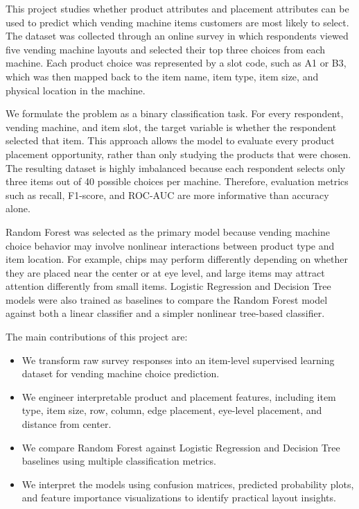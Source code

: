 \documentclass{article}
\begin{document}
This project studies whether product attributes and placement attributes can be used to predict which vending machine items customers are most likely to select. The dataset was collected through an online survey in which respondents viewed five vending machine layouts and selected their top three choices from each machine. Each product choice was represented by a slot code, such as A1 or B3, which was then mapped back to the item name, item type, item size, and physical location in the machine.

We formulate the problem as a binary classification task. For every respondent, vending machine, and item slot, the target variable is whether the respondent selected that item. This approach allows the model to evaluate every product placement opportunity, rather than only studying the products that were chosen. The resulting dataset is highly imbalanced because each respondent selects only three items out of 40 possible choices per machine. Therefore, evaluation metrics such as recall, F1-score, and ROC-AUC are more informative than accuracy alone.

Random Forest was selected as the primary model because vending machine choice behavior may involve nonlinear interactions between product type and item location. For example, chips may perform differently depending on whether they are placed near the center or at eye level, and large items may attract attention differently from small items. Logistic Regression and Decision Tree models were also trained as baselines to compare the Random Forest model against both a linear classifier and a simpler nonlinear tree-based classifier.

The main contributions of this project are:
\begin{itemize}
    \item We transform raw survey responses into an item-level supervised learning dataset for vending machine choice prediction.
    \item We engineer interpretable product and placement features, including item type, item size, row, column, edge placement, eye-level placement, and distance from center.
    \item We compare Random Forest against Logistic Regression and Decision Tree baselines using multiple classification metrics.
    \item We interpret the models using confusion matrices, predicted probability plots, and feature importance visualizations to identify practical layout insights.
\end{itemize}
\end{document}
